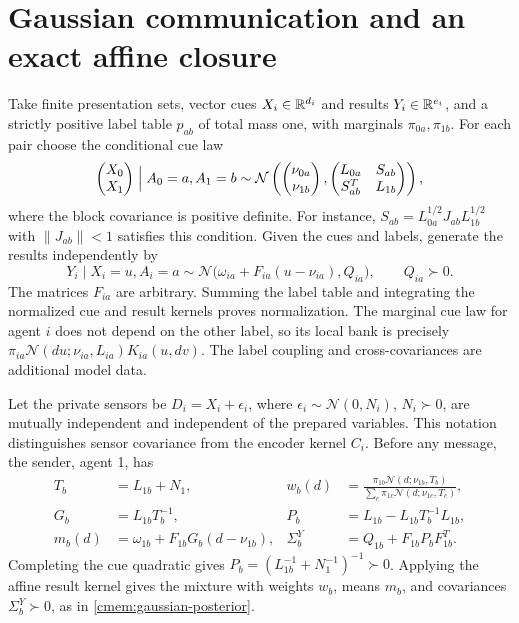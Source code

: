 \section{Gaussian communication and an exact affine closure}

Take finite presentation sets, vector cues $X_i\in\mathbb R^{d_i}$ and results $Y_i\in\mathbb R^{e_i}$, and a strictly positive label table $p_{ab}$ of total mass one, with marginals $\pi_{0a},\pi_{1b}$. For each pair choose the conditional cue law
\begin{equation}
 \begin{pmatrix}X_0\\X_1\end{pmatrix}\Bigm|A_0=a,A_1=b
 \sim\mathcal N\left(
 \begin{pmatrix}\nu_{0a}\\\nu_{1b}\end{pmatrix},
 \begin{pmatrix}L_{0a}&S_{ab}\\S_{ab}^T&L_{1b}\end{pmatrix}\right),
 \label{imem:gaussian-coupling}
\end{equation}
where the block covariance is positive definite. For instance,
$S_{ab}=L_{0a}^{1/2}J_{ab}L_{1b}^{1/2}$ with $\|J_{ab}\|<1$ satisfies this condition. Given the cues and labels, generate the results independently by
\begin{equation}
 Y_i\mid X_i=u,A_i=a
 \sim\mathcal N\bigl(\omega_{ia}+F_{ia}(u-\nu_{ia}),Q_{ia}\bigr),
 \qquad Q_{ia}\succ0.
 \label{imem:gaussian-results}
\end{equation}
The matrices $F_{ia}$ are arbitrary. Summing the label table and integrating the normalized cue and result kernels proves normalization. The marginal cue law for agent $i$ does not depend on the other label, so its local bank is precisely
$\pi_{ia}\mathcal N(du;\nu_{ia},L_{ia})K_{ia}(u,dv)$. The label coupling and cross-covariances are additional model data.

Let the private sensors be $D_i=X_i+\epsilon_i$, where $\epsilon_i\sim\mathcal N(0,N_i)$, $N_i\succ0$, are mutually independent and independent of the prepared variables. This notation distinguishes sensor covariance from the encoder kernel $C_i$. Before any message, the sender, agent 1, has
\begin{equation}
 \begin{aligned}
 T_b&=L_{1b}+N_1,&
 w_b(d)&=\frac{\pi_{1b}\mathcal N(d;\nu_{1b},T_b)}
 {\sum_c\pi_{1c}\mathcal N(d;\nu_{1c},T_c)},\\
 G_b&=L_{1b}T_b^{-1},&
 P_b&=L_{1b}-L_{1b}T_b^{-1}L_{1b},\\
 m_b(d)&=\omega_{1b}+F_{1b}G_b(d-\nu_{1b}),&
 \Sigma_b^Y&=Q_{1b}+F_{1b}P_bF_{1b}^T.
 \end{aligned}
 \label{imem:gaussian-private-posterior}
\end{equation}
Completing the cue quadratic gives $P_b=(L_{1b}^{-1}+N_1^{-1})^{-1}\succ0$. Applying the affine result kernel gives the mixture with weights $w_b$, means $m_b$, and covariances $\Sigma_b^Y\succ0$, as in \cref{cmem:gaussian-posterior}.

